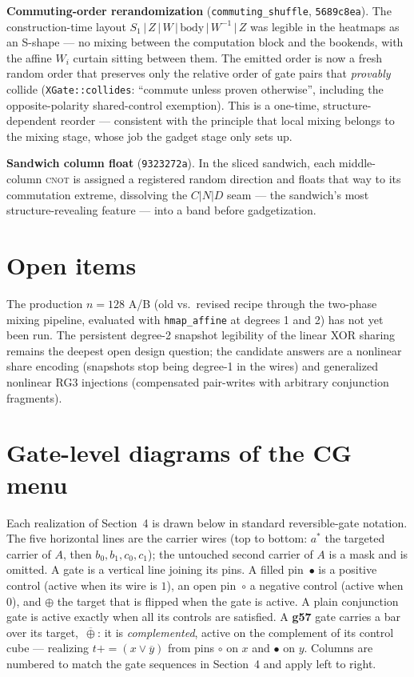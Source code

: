 \documentclass[11pt]{article}
\newcommand{\CNOT}{\textsc{cnot}}
\newcommand{\code}[1]{\texttt{#1}}
\newcommand{\pe}{\mathrel{{+}{=}}}    %
\begin{document}
\textbf{Commuting-order rerandomization} (\code{commuting\_shuffle},
\code{5689c8ea}). The construction-time layout $S_1\,|\,Z\,|\,W\,|\,
\text{body}\,|\,W^{-1}\,|\,Z$ was legible in the heatmaps as an S-shape
--- no mixing between the computation block and the bookends, with the
affine $W_i$ curtain sitting between them. The emitted order is now a
fresh random order that preserves only the relative order of gate pairs
that \emph{provably} collide (\code{XGate::collides}: ``commute unless
proven otherwise'', including the opposite-polarity shared-control
exemption). This is a one-time, structure-dependent reorder --- consistent
with the principle that local mixing belongs to the mixing stage, whose
job the gadget stage only sets up.

\textbf{Sandwich column float} (\code{9323272a}). In the sliced sandwich,
each middle-column \CNOT{} is assigned a registered random direction and
floats that way to its commutation extreme, dissolving the $C|N|D$ seam
--- the sandwich's most structure-revealing feature --- into a band before
gadgetization.

\section{Open items}

The production $n{=}128$ A/B (old vs.\ revised recipe through the
two-phase mixing pipeline, evaluated with \code{hmap\_affine} at degrees 1
and 2) has not yet been run. The persistent degree-2 snapshot legibility
of the linear XOR sharing remains the deepest open design question; the
candidate answers are a nonlinear share encoding (snapshots stop being
degree-1 in the wires) and generalized nonlinear RG3 injections
(compensated pair-writes with arbitrary conjunction fragments).

\appendix
\section{Gate-level diagrams of the CG menu}\label{app:cgfigs}

Each realization of Section~4 is drawn below in standard reversible-gate
notation. The five horizontal lines are the carrier wires (top to bottom:
$a^\ast$ the targeted carrier of $A$, then $b_0, b_1, c_0, c_1$); the
untouched second carrier of $A$ is a mask and is omitted. A gate is a
vertical line joining its pins. A filled pin~$\bullet$ is a positive
control (active when its wire is $1$), an open pin~$\circ$ a negative
control (active when $0$), and $\oplus$ the target that is flipped when the
gate is active. A plain conjunction gate is active exactly when all its
controls are satisfied. A \textbf{g57} gate carries a bar over its
target,~$\overline{\oplus}$: it is \emph{complemented}, active on the
complement of its control cube --- realizing $t \pe (x \vee \overline{y})$
from pins $\circ$ on $x$ and $\bullet$ on $y$. Columns are numbered to match
the gate sequences in Section~4 and apply left to right.
\end{document}
